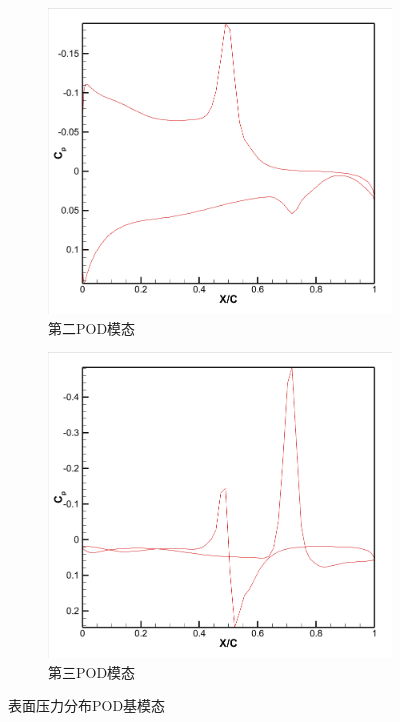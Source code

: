 \begin{figure}[H]
\begin{subfigure}[b]{0.32\textwidth}
        \includegraphics[width=\textwidth]{image/基压力分布图/单变量表面压力基2.png}
        \caption{第二POD模态}
    \end{subfigure}
    \begin{subfigure}[b]{0.32\textwidth}
        \includegraphics[width=\textwidth]{image/基压力分布图/单变量表面压力基3.png}
        \caption{第三POD模态}
    \end{subfigure}
    \caption{\songti 表面压力分布POD基模态}
    \label{fig:surface_pod_modes}
\end{figure}

